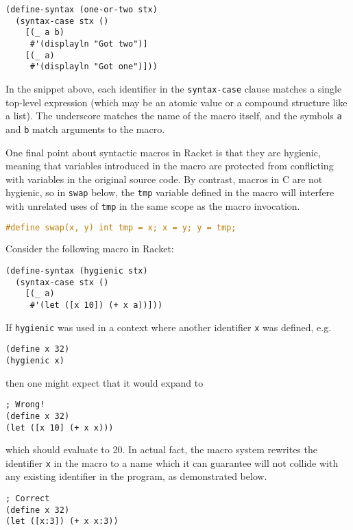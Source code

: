 \documentclass{article}
\begin{document}
\begin{lstlisting}
(define-syntax (one-or-two stx)
  (syntax-case stx ()
    [(_ a b)
     #'(displayln "Got two")]
    [(_ a)
     #'(displayln "Got one")]))
\end{lstlisting}

In the snippet above, each identifier in the \texttt{syntax-case} clause matches a single top-level expression (which may be an atomic value or a compound structure like a list). The underscore matches the name of the macro itself, and the symbols \texttt{a} and \texttt{b} match arguments to the macro.

One final point about syntactic macros in Racket is that they are hygienic, meaning that variables introduced in the macro are protected from conflicting with variables in the original source code. By contrast, macros in C are not hygienic, so in \texttt{swap} below, the \texttt{tmp} variable defined in the macro will interfere with unrelated uses of \texttt{tmp} in the same scope as the macro invocation.

\begin{lstlisting}[language=C]
#define swap(x, y) int tmp = x; x = y; y = tmp;
\end{lstlisting}

Consider the following macro in Racket:

\begin{lstlisting}
(define-syntax (hygienic stx)
  (syntax-case stx ()
    [(_ a)
     #'(let ([x 10]) (+ x a))]))
\end{lstlisting}

If \texttt{hygienic} was used in a context where another identifier \texttt{x} was defined, e.g.

\begin{lstlisting}
(define x 32)
(hygienic x)
\end{lstlisting}

then one might expect that it would expand to

\begin{lstlisting}
; Wrong!
(define x 32)
(let ([x 10] (+ x x)))
\end{lstlisting}

which should evaluate to 20. In actual fact, the macro system rewrites the identifier \texttt{x} in the macro to a name which it can guarantee will not collide with any existing identifier in the program, as demonstrated below.

\begin{lstlisting}
; Correct
(define x 32)
(let ([x:3]) (+ x x:3))
\end{lstlisting}
\end{document}
